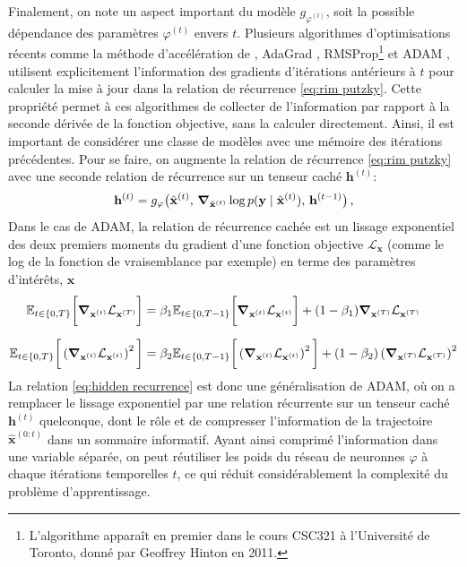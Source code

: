 Finalement, on note un aspect important du modèle $g_{\varphi^{(t)}}$, soit la possible dépendance des paramètres $\varphi^{(t)}$ envers $t$. Plusieurs 
algorithmes d'optimisations récents comme la méthode d'accélération de \citet{Nesterov1983}, 
AdaGrad \citep{Duchi2011}, RMSProp\footnote{L'algorithme apparaît en premier dans le cours CSC321 à l'Université de Toronto, donné par Geoffrey Hinton en 2011.} \citep{Hinton2012} 
et ADAM \citep{Kingma2014},
utilisent explicitement l'information 
des gradients d'itérations antérieurs à $t$ pour calculer la mise à jour dans la relation de récurrence \eqref{eq:rim putzky}.
Cette propriété permet à ces algorithmes de collecter de l'information par rapport à la seconde dérivée de la fonction 
objective, sans la calculer directement.
Ainsi, il est important de considérer une classe de modèles avec une mémoire des itérations précédentes. 
Pour se faire, on augmente la relation de récurrence \eqref{eq:rim putzky} avec une seconde relation de 
récurrence sur un tenseur caché $\mathbf{h}^{(t)}$:
\begin{equation}\label{eq:hidden recurrence}
        \mathbf{h}^{(t)} = g_{\varphi}\big(\hat{\mathbf{x}}^{(t)},\, \grad_{\hat{\mathbf{x}}^{(t)}} \log p(\mathbf{y} \mid \hat{\mathbf{x}}^{(t)}),\,  \mathbf{h}^{(t-1)}\big)\, ,
\end{equation} 
Dans le cas de ADAM, la relation de récurrence cachée est un lissage exponentiel des deux premiers 
moments du gradient d'une fonction objective $\mathcal{L}_{\mathbf{x}}$ (comme le log de la fonction de vraisemblance par exemple) 
en terme des paramètres d'intérêts, $\mathbf{x}$
\begin{align}
        \mathbb{E}_{t \in \{0,T\}}\bigg[ \grad_{\mathbf{x}^{(t)}} \mathcal{L}_{\mathbf{x}^{(T)}}\bigg]  &= \beta_1 
        \mathbb{E}_{t \in \{0,T-1\}}\bigg[ \grad_{\mathbf{x}^{(t)}} \mathcal{L}_{\mathbf{x}^{(t)}} \bigg]  
        + (1 - \beta_1) \grad_{\mathbf{x}^{(T)}} \mathcal{L}_{\mathbf{x}^{(T)}} \\[1.5ex]
        \mathbb{E}_{t \in \{0,T\}}\bigg[ \left(\grad_{\mathbf{x}^{(t)}} \mathcal{L}_{\mathbf{x}^{(t)}}\right)^{2}\bigg]  &= \beta_2
        \mathbb{E}_{t \in \{0,T-1\}}\bigg[ \left(\grad_{\mathbf{x}^{(t)}} \mathcal{L}_{\mathbf{x}^{(t)}}\right)^{2} \bigg]  
        + (1 - \beta_2) \left(\grad_{\mathbf{x}^{(T)}} \mathcal{L}_{\mathbf{x}^{(T)}}\right)^{2}
\end{align}
La relation \eqref{eq:hidden recurrence} est donc une généralisation de ADAM, 
où on a remplacer le lissage exponentiel par une relation récurrente sur un tenseur caché $\mathbf{h}^{(t)}$ quelconque, 
dont le rôle et de compresser l'information de 
la trajectoire $\hat{\mathbf{x}}^{(0:t)}$ dans un sommaire informatif. Ayant ainsi comprimé l'information dans une variable 
séparée, on peut réutiliser les poids du réseau de neuronnes $\varphi$ à chaque itérations temporelles $t$, ce 
qui réduit considérablement la complexité du problème d'apprentissage.


